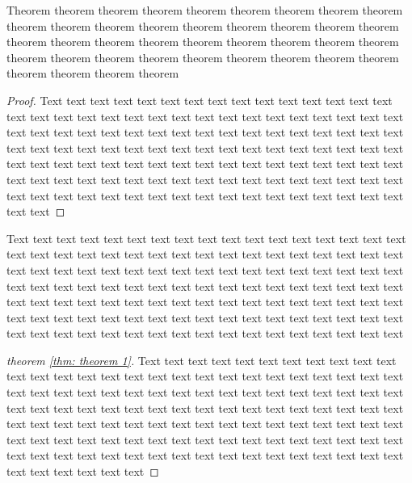\documentclass{Thesis}
\begin{document}
\begin{theorem}\label{thm: theorem 1}
  Theorem theorem  theorem theorem theorem theorem theorem theorem theorem theorem theorem theorem theorem theorem theorem theorem theorem theorem theorem theorem theorem theorem theorem theorem theorem theorem theorem theorem theorem theorem theorem theorem theorem theorem theorem theorem theorem theorem theorem theorem
\end{theorem}

\begin{proof}
  Text text text text text text text text text text text text text text text text text text text text text text text text text text text text text text text text text text text text text text text text text text text text text text text text text text text text text text text text text text text text text text text text text text text text text text text text text text text text text text text text text text text text text text text text text text text text text text text text text text text text text text text text text text text text text text text text text text text text text text text
\end{proof}

Text text text text text text text text text text text text text text text text text text text text text text text text text text text text text text text text text text text text text text text text text text text text text text text text text text text text text text text text text text text text text text text text text text text text text text text text text text text text text text text text text text text text text text text text text text text text text text text text text text text text text text text text text text text text text text text text text text text text text text text

\begin{proof}[theorem \ref{thm: theorem 1}]
  Text text text text text text text text text text text text text text text text text text text text text text text text text text text text text text text text text text text text text text text text text text text text text text text text text text text text text text text text text text text text text text text text text text text text text text text text text text text text text text text text text text text text text text text text text text text text text text text text text text text text text text text text text text text text text text text text text text text text text text text
\end{proof}
\end{document}
